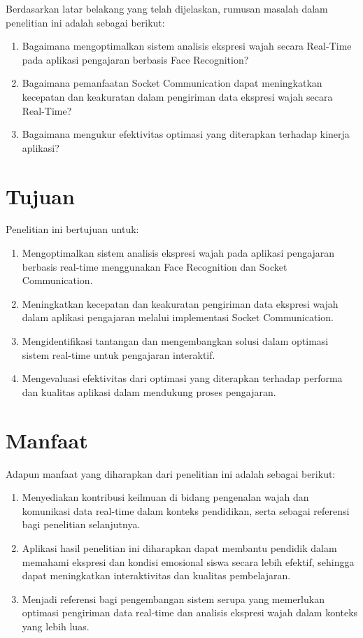{Berdasarkan latar belakang yang telah dijelaskan, rumusan masalah dalam
penelitian ini adalah sebagai berikut:}

\begin{enumerate}
\item
  {Bagaimana mengoptimalkan sistem analisis ekspresi wajah secara
  Real-Time pada aplikasi pengajaran berbasis Face Recognition?}
\item
  {Bagaimana pemanfaatan Socket Communication dapat meningkatkan
  kecepatan dan keakuratan dalam pengiriman data ekspresi wajah secara
  Real-Time?}
\item
  {Bagaimana mengukur efektivitas optimasi yang diterapkan terhadap
  kinerja aplikasi?}
\end{enumerate}

\section{Tujuan}

{Penelitian ini bertujuan untuk:}

\begin{enumerate}
\item
  {Mengoptimalkan sistem analisis ekspresi wajah pada aplikasi
  pengajaran berbasis real-time menggunakan Face Recognition dan Socket
  Communication.}
\item
  {Meningkatkan kecepatan dan keakuratan pengiriman data ekspresi wajah
  dalam aplikasi pengajaran melalui implementasi Socket Communication.}
\item
  {Mengidentifikasi tantangan dan mengembangkan solusi dalam optimasi
  sistem real-time untuk pengajaran interaktif.}
\item
  {Mengevaluasi efektivitas dari optimasi yang diterapkan terhadap
  performa dan kualitas aplikasi dalam mendukung proses pengajaran.}
\end{enumerate}

\section{Manfaat}

{Adapun manfaat yang diharapkan dari penelitian ini adalah sebagai
berikut:}

\begin{enumerate}
\item
  {Menyediakan kontribusi keilmuan di bidang pengenalan wajah dan
  komunikasi data real-time dalam konteks pendidikan, serta sebagai
  referensi bagi penelitian selanjutnya.}
\item
  {Aplikasi hasil penelitian ini diharapkan dapat membantu pendidik
  dalam memahami ekspresi dan kondisi emosional siswa secara lebih
  efektif, sehingga dapat meningkatkan interaktivitas dan kualitas
  pembelajaran.}
\item
  {Menjadi referensi bagi pengembangan sistem serupa yang memerlukan
  optimasi pengiriman data real-time dan analisis ekspresi wajah dala}{m
  konteks yang lebih luas.}
\end{enumerate}

